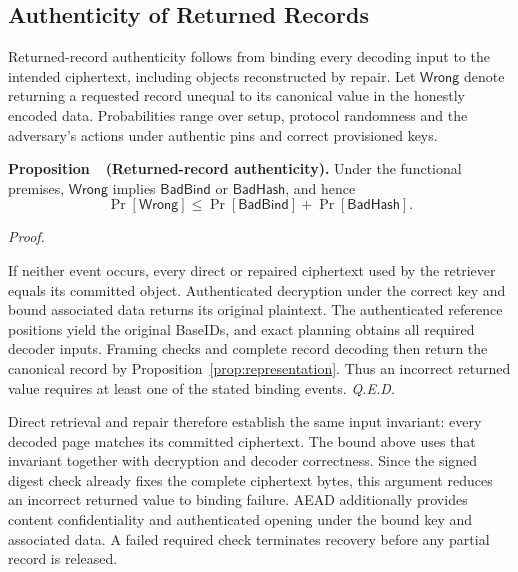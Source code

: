 \documentclass[10pt,journal]{IEEEtran}
\newcounter{proposition}
\newenvironment{proposition}[1]{%
  \refstepcounter{proposition}\par\smallskip\noindent
  \textbf{Proposition~\theproposition\ (#1). }\ignorespaces
}{\par\smallskip}
\newenvironment{claimproof}{\par\noindent\emph{Proof. }\ignorespaces
}{\hfill\textit{Q.E.D.}\par\smallskip}
\begin{document}
\subsection{Authenticity of Returned Records}\label{sec:conditional}
Returned-record authenticity follows from binding every decoding input to
the intended ciphertext, including objects reconstructed by repair.
Let $\mathsf{Wrong}$ denote returning a requested record unequal to its
canonical value in the honestly encoded data. Probabilities range over
setup, protocol randomness and the adversary's actions under authentic pins
and correct provisioned keys.

\begin{proposition}{Returned-record authenticity}\label{prop:record-auth}
Under the functional premises, $\mathsf{Wrong}$ implies
$\mathsf{BadBind}$ or $\mathsf{BadHash}$, and hence
\begin{equation}\label{eq:record-auth}
\Pr[\mathsf{Wrong}]\leq\Pr[\mathsf{BadBind}]+\Pr[\mathsf{BadHash}].
\end{equation}
\end{proposition}
\begin{claimproof}
If neither event occurs, every direct or repaired ciphertext used by the
retriever equals its committed object. Authenticated decryption under the
correct key and bound associated data returns its original plaintext.
The authenticated reference positions yield the original BaseIDs, and exact
planning obtains all required decoder inputs. Framing checks and complete
record decoding then return the canonical record by
Proposition~\ref{prop:representation}. Thus an incorrect returned value
requires at least one of the stated binding events.
\end{claimproof}
Direct retrieval and repair therefore establish the same input invariant:
every decoded page matches its committed ciphertext. The bound above uses
that invariant together with decryption and decoder correctness. Since the
signed digest check already fixes the complete ciphertext bytes, this argument
reduces an incorrect returned value to binding failure. AEAD additionally
provides content confidentiality and authenticated opening under the bound key
and associated data. A failed required
check terminates recovery before any partial record is released.
\end{document}

